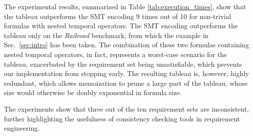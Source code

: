 \documentclass[acmsmall,screen]{acmart}
\begin{document}
The experimental results, summarized in Table \ref{tab:execution_times}, show that the tableau outperforms the SMT encoding 9 times out of 10 for non-trivial formulas with nested temporal operators.
The SMT encoding outperforms the tableau only on the \emph{Railroad} benchmark, from which the example in Sec.~\ref{sec:intro} has been taken.
The combination of these two formulas containing nested temporal operators, in fact, represents a worst-case scenario for the tableau, exacerbated by the requirement set being unsatisfiable, which prevents our implementation from stopping early.
The resulting tableau is, however, highly redundant, which allows memoization to prune a large part of the tableau, whose size would otherwise be doubly exponential in formula size.

The experiments show that three out of the ten requirement sets are inconsistent, further highlighting the usefulness of consistency checking tools in requirement engineering.

\end{document}
